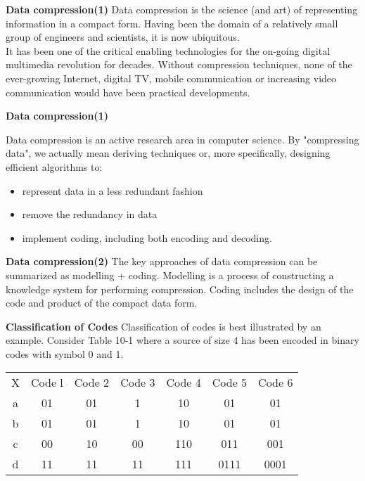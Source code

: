 {
\noindent \textbf{Data compression(1)}
Data compression is the science (and art) of representing information in a compact form. Having been the domain of a relatively small group of engineers and scientists, it is now ubiquitous. \\ \bigskip It has been one of the critical enabling technologies for the on-going digital multimedia revolution for decades. Without compression techniques, none of the ever-growing Internet, digital TV, mobile communication or increasing video communication would have been practical developments. \\ \bigskip
}
{
\noindent \textbf{Data compression(1)}

Data compression is an active research area in computer science. By "compressing data", we actually mean deriving techniques or, more specifically, designing efficient algorithms to:

\begin{itemize}
\item represent data in a less redundant fashion
\item remove the redundancy in data
\item implement coding, including both encoding and decoding.
\end{itemize}

\noindent \textbf{Data compression(2)}
The key approaches of data compression can be summarized as modelling + coding.
Modelling is a process of constructing a knowledge system for
performing compression. Coding includes the design of the code and product of the compact data form.


\noindent \textbf{ Classification of Codes}
Classification of codes is best illustrated by an example. Consider Table 10-1 where a source of
size 4 has been encoded in binary codes with symbol 0 and 1.\\ \bigskip
\begin{tabular}{c c c c c c c}
X& Code l& Code 2& Code 3 &Code 4& Code 5& Code 6\\
a& 01& 01 &1 &10 &01 &01\\
b& 01& 01 &1 &10 &01 &01\\
c &00 &10& 00& 110& 011 &001\\
d &11& 11& 11& 111 &0111 &0001\\
\end{tabular}



}
